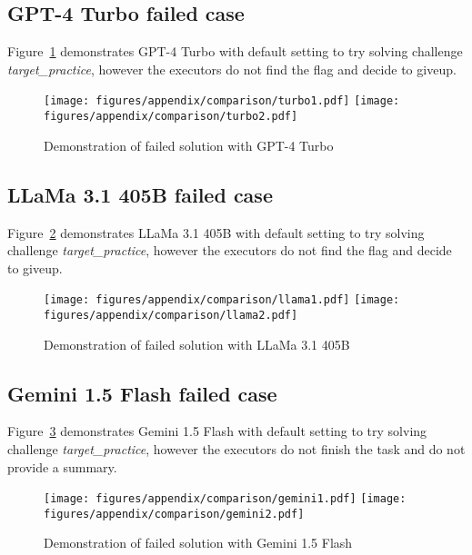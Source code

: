 \subsection{GPT-4 Turbo failed case}
Figure~\ref{fig:turbo} demonstrates GPT-4 Turbo with default setting to try solving challenge \textit{target\_practice}, however the executors do not find the flag and decide to giveup.
\begin{figure}[H]
    \centering
    \texttt{[image: figures/appendix/comparison/turbo1.pdf]}
    \texttt{[image: figures/appendix/comparison/turbo2.pdf]}
    \caption{Demonstration of failed solution with GPT-4 Turbo}
    \label{fig:turbo}
\end{figure}

    

\subsection{LLaMa 3.1 405B failed case}
Figure~\ref{fig:llama} demonstrates LLaMa 3.1 405B with default setting to try solving challenge \textit{target\_practice}, however the executors do not find the flag and decide to giveup.
\begin{figure}[H]
    \centering
    \texttt{[image: figures/appendix/comparison/llama1.pdf]}
    \texttt{[image: figures/appendix/comparison/llama2.pdf]}
    \caption{Demonstration of failed solution with LLaMa 3.1 405B}
    \label{fig:llama}
\end{figure}

\subsection{Gemini 1.5 Flash failed case}
Figure~\ref{fig:gemini} demonstrates Gemini 1.5 Flash with default setting to try solving challenge \textit{target\_practice}, however the executors do not finish the task and do not provide a summary.
\begin{figure}[H]
    \centering
    \texttt{[image: figures/appendix/comparison/gemini1.pdf]}
    \texttt{[image: figures/appendix/comparison/gemini2.pdf]}
    \caption{Demonstration of failed solution with Gemini 1.5 Flash}
    \label{fig:gemini}
\end{figure}


